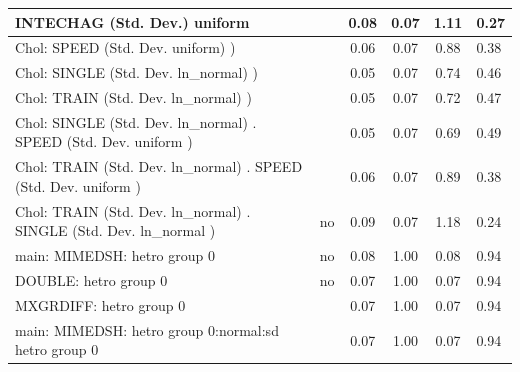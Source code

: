 \begin{table}
\begin{center}
\begin{tabular}{|l|l|c|c|c|l|}
			\hline
			INTECHAG (Std. Dev.) uniform &  & 0.08 & 0.07 & 1.11 & 0.27 \\
			\hline
			 Chol: SPEED (Std. Dev. uniform) ) &  & 0.06 & 0.07 & 0.88 & 0.38 \\
			\hline
			 Chol: SINGLE (Std. Dev. ln_normal) ) &  & 0.05 & 0.07 & 0.74 & 0.46 \\
			\hline
			 Chol: TRAIN (Std. Dev. ln_normal) ) &  & 0.05 & 0.07 & 0.72 & 0.47 \\
			\hline
			 Chol: SINGLE (Std. Dev. ln_normal) . SPEED (Std. Dev.   uniform ) &  & 0.05 & 0.07 & 0.69 & 0.49 \\
			\hline
			 Chol: TRAIN (Std. Dev. ln_normal) . SPEED (Std. Dev.   uniform ) &  & 0.06 & 0.07 & 0.89 & 0.38 \\
			\hline
			 Chol: TRAIN (Std. Dev. ln_normal) . SINGLE (Std. Dev.   ln_normal ) & no & 0.09 & 0.07 & 1.18 & 0.24 \\
			\hline
			main: MIMEDSH: hetro group 0 & no & 0.08 & 1.00 & 0.08 & 0.94 \\
			\hline
			DOUBLE: hetro group 0 & no & 0.07 & 1.00 & 0.07 & 0.94 \\
			\hline
			MXGRDIFF: hetro group 0 &  & 0.07 & 1.00 & 0.07 & 0.94 \\
			\hline
			main: MIMEDSH: hetro group 0:normal:sd  hetro group 0 &  & 0.07 & 1.00 & 0.07 & 0.94 \\
			\hline
		\end{tabular}
	\end{center}
\end{table}